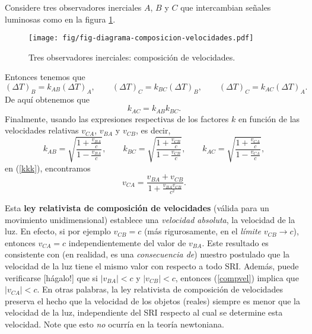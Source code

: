 Considere tres observadores inerciales $A$, $B$ y $C$ que intercambian se\~nales
luminosas como en la figura \ref{k3}.
\begin{figure}[!h]
\centerline{\texttt{[image: fig/fig-diagrama-composicion-velocidades.pdf]}}
 \caption{Tres observadores inerciales: composición de velocidades.}
\label{k3}
\end{figure}
 Entonces tenemos que
\begin{equation}
(\Delta T)_B=k_{AB} (\Delta T)_A, \qquad (\Delta T)_C=k_{BC} (\Delta T)_B,
\qquad (\Delta T)_C=k_{AC} (\Delta T)_A.
\end{equation}
De aquí obtenemos que
\begin{equation}
k_{AC}=k_{AB}k_{BC}.\label{kkk}
\end{equation}
Finalmente, usando las expresiones respectivas de los factores $k$ en función
de las velocidades relativas $v_{CA}$, $v_{BA}$ y $v_{CB}$, es decir,
\begin{equation}
k_{AB}=\sqrt{\frac{1+\frac{v_{BA}}{c}}{1-\frac{v_{BA}}{c}}}, \qquad k_{BC}=\sqrt{\frac{1+\frac{v_{CB}}{c}}{1-\frac{v_{CB}}{c}}} , \qquad k_{AC}=\sqrt{\frac{1+\frac{v_{CA}}{c}}{1-\frac{v_{CA}}{c}}},
\end{equation}
en (\ref{kkk}), encontramos
\begin{equation}
\boxed{v_{CA}=\frac{v_{BA}+v_{CB}}{1+\frac{v_{BA}v_{CB}}{c^2}}.} \label{compvel}
\end{equation}

Esta \textbf{ley relativista de composición de velocidades} (válida para un movimiento unidimensional) establece una \textit{velocidad absoluta}, la
velocidad de la luz. En efecto, si por ejemplo $v_{CB}=c$ (más rigurosamente, en el \textit{límite} $v_{CB}\to c$), entonces $v_{CA}=c$ independientemente del valor de $v_{BA}$. Este resultado es consistente con (en realidad, es una \textit{consecuencia de}) nuestro postulado que la velocidad de la luz tiene el mismo valor con respecto a todo SRI. Además, puede verificarse [hágalo!] que si $|v_{BA}|<c$ y $|v_{CB}|<c$, entonces  (\ref{compvel}) implica que $|v_{CA}|<c$. En otras palabras, la ley relativista de composición de velocidades preserva el hecho que la velocidad de los objetos (reales) siempre es menor que la velocidad de la luz, independiente del SRI respecto al cual se determine esta velocidad. Note que esto \textit{no} ocurría en la teoría newtoniana.



